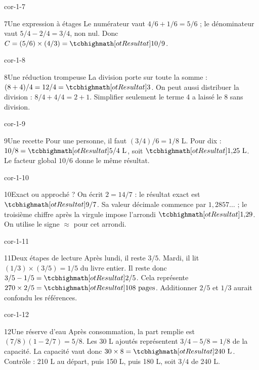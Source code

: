 \begin{blocLivre}{cor-1-7}\begin{corrige}{7}{Une expression à étages}
Le numérateur vaut $4/6+1/6=5/6$ ; le dénominateur vaut $5/4-2/4=3/4$, non nul. Donc $C=(5/6)\times(4/3)=\res{10/9}$.
\end{corrige}\end{blocLivre}
\begin{blocLivre}{cor-1-8}\begin{corrige}{8}{Une réduction trompeuse}
La division porte sur toute la somme : $(8+4)/4=12/4=\res3$. On peut aussi distribuer la division : $8/4+4/4=2+1$. Simplifier seulement le terme 4 a laissé le 8 sans division.
\end{corrige}\end{blocLivre}
\begin{blocLivre}{cor-1-9}\begin{corrige}{9}{Une recette}
Pour une personne, il faut $(3/4)/6=1/8$ L. Pour dix : $10/8=\res{5/4\text{ L}}$, soit $\res{1{,}25\text{ L}}$. Le facteur global $10/6$ donne le même résultat.
\end{corrige}\end{blocLivre}
\begin{blocLivre}{cor-1-10}\begin{corrige}{10}{Exact ou approché ?}
On écrit $2=14/7$ : le résultat exact est $\res{9/7}$. Sa valeur décimale commence par $1{,}2857\ldots$ ; le troisième chiffre après la virgule impose l’arrondi $\res{1{,}29}$. On utilise le signe $\approx$ pour cet arrondi.
\end{corrige}\end{blocLivre}
\begin{blocLivre}{cor-1-11}\begin{corrige}{11}{Deux étapes de lecture}
Après lundi, il reste $3/5$. Mardi, il lit $(1/3)\times(3/5)=1/5$ du livre entier. Il reste donc $3/5-1/5=\res{2/5}$. Cela représente $270\times2/5=\res{108\text{ pages}}$. Additionner $2/5$ et $1/3$ aurait confondu les références.
\end{corrige}\end{blocLivre}
\begin{blocLivre}{cor-1-12}\begin{corrige}{12}{Une réserve d’eau}
Après consommation, la part remplie est $(7/8)(1-2/7)=5/8$. Les 30 L ajoutés représentent $3/4-5/8=1/8$ de la capacité. La capacité vaut donc $30\times8=\res{240\text{ L}}$. Contrôle : 210 L au départ, puis 150 L, puis 180 L, soit $3/4$ de 240 L.
\end{corrige}\end{blocLivre}
